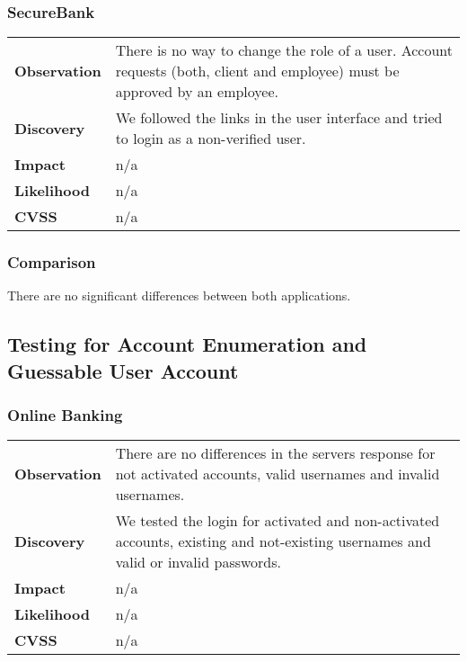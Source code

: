 \subsubsection*{SecureBank}

\begin{tabular}{l|p{10cm}}

\textbf{Observation} & There is no way to change the role of a user. Account requests (both, client and employee) must be approved by an employee.  \\
\textbf{Discovery} & We followed the links in the user interface and tried to login as a non-verified user. \\
\textbf{Impact} & n/a \\
\textbf{Likelihood} & n/a \\
\textbf{CVSS} & n/a \\
\end{tabular}

\subsubsection*{Comparison}
There are no significant differences between both applications.

\clearpage





\subsection{Testing for Account Enumeration and Guessable User Account}

\subsubsection*{Online Banking}

\begin{tabular}{l|p{10cm}}

\textbf{Observation} & There are no differences in the servers response for not activated accounts, valid usernames and invalid usernames.  \\
\textbf{Discovery} & We tested the login for activated and non-activated accounts, existing and not-existing usernames and valid or invalid passwords. \\
\textbf{Impact} & n/a \\
\textbf{Likelihood} & n/a \\
\textbf{CVSS} & n/a \\
\end{tabular}

